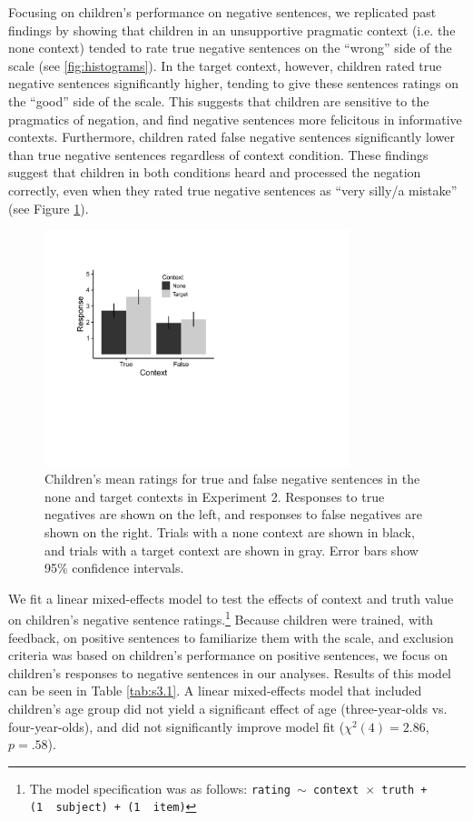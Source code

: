 \documentclass[man, noapacite]{apa2}
\begin{document}
Focusing on children's performance on negative sentences, we replicated past findings by showing that children in an unsupportive pragmatic context (i.e. the none context) tended to rate true negative sentences on the ``wrong'' side of the scale (see \ref{fig:histograms}). In the target context, however, children rated true negative sentences significantly higher, tending to give these sentences ratings on the ``good'' side of the scale. This suggests that children are sensitive to the pragmatics of negation, and find negative sentences more felicitous in informative contexts. Furthermore, children rated false negative sentences significantly lower than true negative sentences regardless of context condition. These findings suggest that children in both conditions heard and processed the negation correctly, even when they rated true negative sentences as ``very silly/a mistake'' (see Figure \ref{fig:childmeans}).

\begin{figure}
\begin{center}
\includegraphics[width=3.5in]{figures/childmeans.pdf}
\caption{\label{fig:childmeans} Children's mean ratings for true and false negative sentences in the none and target contexts in Experiment 2. Responses to true negatives are shown on the left, and responses to false negatives are shown on the right. Trials with a none context are shown in black, and trials with a target context are shown in gray. Error bars show 95\% confidence intervals.}
\end{center}
\end{figure}

We fit a linear mixed-effects model to test the effects of context and truth value on children's negative sentence ratings.\footnote{ The model specification was as follows: \texttt{rating $\sim$ context~$\times$~truth + (1~\textbar~subject) + (1~\textbar~item)}}  Because children were trained, with feedback, on positive sentences to familiarize them with the scale, and exclusion criteria was based on children's performance on positive sentences, we focus on children's responses to negative sentences in our analyses. Results of this model can be seen in Table \ref{tab:s3.1}. A linear mixed-effects model that included children's age group did not yield a significant effect of age (three-year-olds vs. four-year-olds), and did not significantly improve model fit ($\chi ^{2}(4) = 2.86$, $p=.58$).
\end{document}
